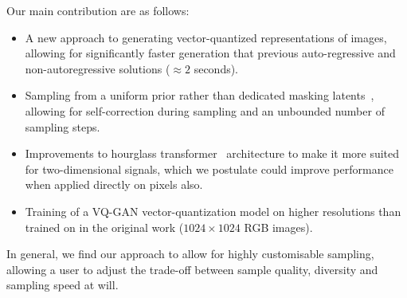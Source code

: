 Our main contribution are as follows:
\begin{itemize}
    \item A new approach to generating vector-quantized representations of
        images, allowing for significantly faster generation that previous
        auto-regressive and non-autoregressive solutions ($\approx 2$ seconds).
    \item Sampling from a uniform prior rather than dedicated masking
        latents~\cite{bondtaylor2021unleashing,austin2021structured},
        allowing for self-correction during sampling and an unbounded number of
        sampling steps.
    \item Improvements to hourglass transformer~\cite{nawrot2021hierarchical}
        architecture to make it more suited for two-dimensional signals, which
        we postulate could improve performance when applied directly on pixels
        also.
    \item Training of a VQ-GAN vector-quantization model on higher resolutions
        than trained on in the original work ($1024 \times 1024$ RGB images).
\end{itemize}

In general, we find our approach to allow for highly customisable sampling,
allowing a user to adjust the trade-off between sample quality, diversity and
sampling speed at will.
